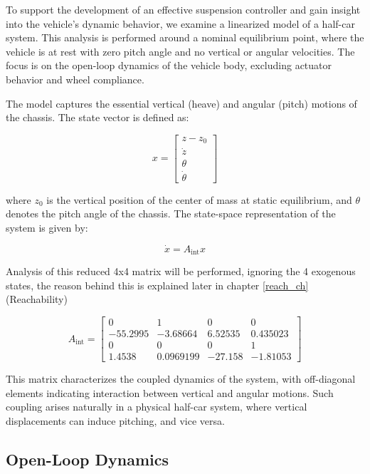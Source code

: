 \documentclass[]{report}
\begin{document}
	To support the development of an effective suspension controller and gain insight into the vehicle's dynamic behavior, we examine a linearized model of a half-car system. This analysis is performed around a nominal equilibrium point, where the vehicle is at rest with zero pitch angle and no vertical or angular velocities. The focus is on the open-loop dynamics of the vehicle body, excluding actuator behavior and wheel compliance.
	
	The model captures the essential vertical (heave) and angular (pitch) motions of the chassis. The state vector is defined as:
	
	\begin{equation}	
		x = \begin{bmatrix}
			z - z_0 \\
			\dot{z} \\
			\theta \\
			\dot{\theta}
		\end{bmatrix}
	\end{equation}
	
	
	where \( z_0 \) is the vertical position of the center of mass at static equilibrium, and \( \theta \) denotes the pitch angle of the chassis. The state-space representation of the system is given by:
	
	\begin{equation}
		\dot{x} = A_{\text{int}} x
	\end{equation}
	
	
	Analysis of this reduced 4x4 matrix will be performed, ignoring the 4 exogenous states, the reason behind this is explained later in chapter \ref{reach_ch} (Reachability)

\begin{equation}
		A_{\text{int}} =
	\begin{bmatrix}
		0 & 1 & 0 & 0 \\
		-55.2995 & -3.68664 & 6.52535 & 0.435023 \\
		0 & 0 & 0 & 1 \\
		1.4538 & 0.0969199 & -27.158 & -1.81053 
	\end{bmatrix}
\end{equation}

	
	This matrix characterizes the coupled dynamics of the system, with off-diagonal elements indicating interaction between vertical and angular motions. Such coupling arises naturally in a physical half-car system, where vertical displacements can induce pitching, and vice versa.
	
	\subsection{Open-Loop Dynamics}
	
\end{document}

